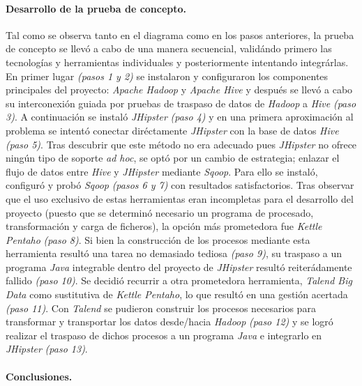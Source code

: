\paragraph*{Desarrollo de la prueba de concepto.}
Tal como se observa tanto en el diagrama como en los pasos anteriores, la prueba de concepto se llevó a cabo de una manera secuencial, validándo primero las tecnologías y herramientas individuales y posteriormente intentando integrárlas. En primer lugar \textit{(pasos 1 y 2)} se instalaron y configuraron los componentes principales del proyecto: \textit{Apache Hadoop} y \textit{Apache Hive} y después se llevó a cabo su interconexión guiada por pruebas de traspaso de datos de \textit{Hadoop} a \textit{Hive} \textit{(paso 3)}. A continuación se instaló \textit{JHipster} \textit{(paso 4)} y en una primera aproximación al problema se intentó conectar diréctamente \textit{JHipster} con la base de datos \textit{Hive} \textit{(paso 5)}. Tras descubrir que este método no era adecuado pues \textit{JHipster} no ofrece ningún tipo de soporte \textit{ad hoc}, se optó por un cambio de estrategia; enlazar el flujo de datos entre \textit{Hive} y \textit{JHipster} mediante \textit{Sqoop}. Para ello se instaló, configuró y probó \textit{Sqoop} \textit{(pasos 6 y 7)} con resultados satisfactorios. Tras observar que el uso exclusivo de estas herramientas eran incompletas para el desarrollo del proyecto (puesto que se determinó necesario un programa de procesado, transformación y carga de ficheros), la opción más prometedora fue \textit{Kettle Pentaho} \textit{(paso 8)}. Si bien la construcción de los procesos mediante esta herramienta resultó una tarea no demasiado tediosa \textit{(paso 9)}, su traspaso a un programa \textit{Java} integrable dentro del proyecto de \textit{JHipster} resultó reiterádamente fallido \textit{(paso 10)}. Se decidió recurrir a otra prometedora herramienta, \textit{Talend Big Data} como sustitutiva de \textit{Kettle Pentaho}, lo que resultó en una gestión acertada \textit{(paso 11)}. 
Con \textit{Talend} se pudieron construir los procesos necesarios para transformar y transportar los datos desde/hacia \textit{Hadoop} \textit{(paso 12)} y se logró realizar el traspaso de dichos procesos a un programa \textit{Java} e integrarlo en \textit{JHipster} \textit{(paso 13)}.

\par
\paragraph*{Conclusiones.}

